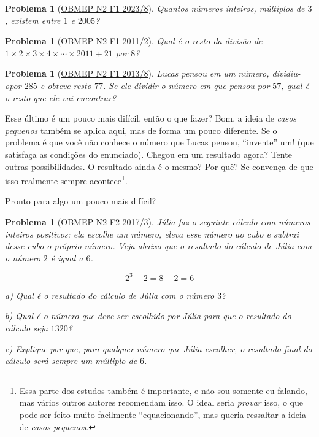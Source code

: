 \documentclass{article}
\newcommand{\q}[1]{``#1''}
\newtheorem{problem}[theorem]{Problema}
\begin{document}
\begin{problem}[\href{https://drive.google.com/file/d/1OvkQTJOquHW-GosgbO7oCZoEDN6zm3NS/view}{OBMEP N2 F1 2023/8}]
Quantos números inteiros, múltiplos de $3$, existem entre $1$ e $2005$?
\end{problem}

\begin{problem}[\href{https://drive.google.com/file/d/1vlaDBGODXE2Y4-JruC-UsVO7AWzGOjHd/view}{OBMEP N2 F1 2011/2}]
Qual é o resto da divisão de $1 \times 2 \times 3 \times 4 \times \cdots \times 2011 + 21$ por $8$?
\end{problem}

\begin{problem}[\href{https://drive.google.com/file/d/1vWfi0STjlUsbCGdR_dJwNpiSlgZPGopx/view}{OBMEP N2 F1 2013/8}]
Lucas pensou em um número, dividiu-opor $285$ e obteve resto $77$. Se ele dividir o número em que pensou por $57$, qual é o resto que ele vai encontrar?
\end{problem}

Esse último é um pouco mais difícil, então o que fazer? Bom, a ideia de \textit{casos pequenos} também se aplica aqui, mas de forma um pouco diferente. Se o problema é que você não conhece o número que Lucas pensou, \q{invente} um! (que satisfaça as condições do enunciado). Chegou em um resultado agora? Tente outras possibilidades. O resultado ainda é o mesmo? Por quê? Se convença de que isso realmente sempre acontece\footnote{Essa parte dos estudos também é importante, e não sou somente eu falando, mas vários outros autores recomendam isso. O ideal seria \textit{provar} isso, o que pode ser feito muito facilmente \q{equacionando}, mas queria ressaltar a ideia de \textit{casos pequenos}.}.

Pronto para algo um pouco mais difícil?

\begin{problem}[\href{https://drive.google.com/file/d/1Efqjc-S8utWqKidOLtr_C4QoqPgaxHST/view}{OBMEP N2 F2 2017/3}]
Júlia faz o seguinte cálculo com números inteiros positivos: ela escolhe um número, eleva esse número ao cubo e subtrai desse cubo o próprio número. Veja abaixo que o resultado do cálculo de Júlia com o número $2$ é igual a $6$.

\[2^3 - 2 = 8 - 2 = 6\]

a) Qual é o resultado do cálculo de Júlia com o número $3$?

b) Qual é o número que deve ser escolhido por Júlia para que o resultado do cálculo seja $1320$?

c) Explique por que, para qualquer número que Júlia escolher, o resultado final do cálculo será sempre um múltiplo de $6$.
\end{problem}
\end{document}
